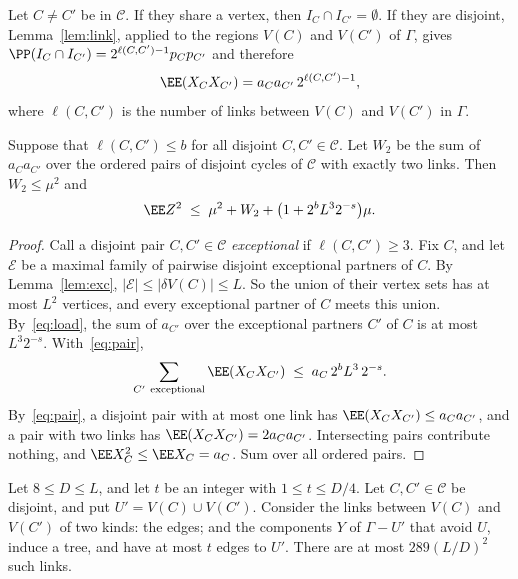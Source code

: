 Let $C\ne C'$ be in $\mathcal{C}$. If they share a vertex, then $I_C\cap I_{C'}=\emptyset$. If they
are disjoint, Lemma~\ref{lem:link}, applied to the regions $V(C)$ and $V(C')$ of $\Gamma$, gives
$\PP(I_C\cap I_{C'})=2^{\ell(C,C')-1}p_Cp_{C'}$ and therefore
\begin{equation}\label{eq:pair}
  \EE(X_CX_{C'})=a_Ca_{C'}\,2^{\ell(C,C')-1},
\end{equation}
where $\ell(C,C')$ is the number of links between $V(C)$ and $V(C')$ in $\Gamma$.

\begin{lemma}\label{lem:moment}
Suppose that $\ell(C,C')\le b$ for all disjoint $C,C'\in\mathcal{C}$. Let $W_2$ be the sum of
$a_Ca_{C'}$ over the ordered pairs of disjoint cycles of $\mathcal{C}$ with exactly two links. Then
$W_2\le\mu^{2}$ and
\[
  \EE Z^{2}\;\le\;\mu^{2}+W_2+\bigl(1+2^{b}L^{3}2^{-s}\bigr)\mu .
\]
\end{lemma}

\begin{proof}
Call a disjoint pair $C,C'\in\mathcal{C}$ \emph{exceptional} if $\ell(C,C')\ge3$. Fix $C$, and let
$\mathcal{E}$ be a maximal family of pairwise disjoint exceptional partners of $C$. By
Lemma~\ref{lem:exc}, $|\mathcal{E}|\le|\delta V(C)|\le L$. So the union of their vertex sets has
at most $L^{2}$ vertices, and every exceptional partner of $C$ meets this union.
By~\eqref{eq:load}, the sum of $a_{C'}$ over the exceptional partners $C'$ of $C$ is at most
$L^{3}2^{-s}$. With~\eqref{eq:pair},
\[
  \sum_{C'\ \mathrm{exceptional}}\EE(X_CX_{C'})\;\le\;a_C\,2^{b}L^{3}\,2^{-s}.
\]
By~\eqref{eq:pair}, a disjoint pair with at most one link has $\EE(X_CX_{C'})\le a_Ca_{C'}$, and
a pair with two links has $\EE(X_CX_{C'})=2a_Ca_{C'}$. Intersecting pairs contribute nothing, and
$\EE X_C^{2}\le\EE X_C=a_C$. Sum over all ordered pairs.
\end{proof}

\begin{lemma}\label{lem:treelinks}
Let $8\le D\le L$, and let $t$ be an integer with $1\le t\le D/4$. Let $C,C'\in\mathcal{C}$ be
disjoint, and put $U'=V(C)\cup V(C')$. Consider the links between $V(C)$ and $V(C')$ of two
kinds: the edges; and the components $Y$ of $\Gamma-U'$ that avoid $U$, induce a tree, and have
at most $t$ edges to $U'$. There are at most $289(L/D)^{2}$ such links.
\end{lemma}

